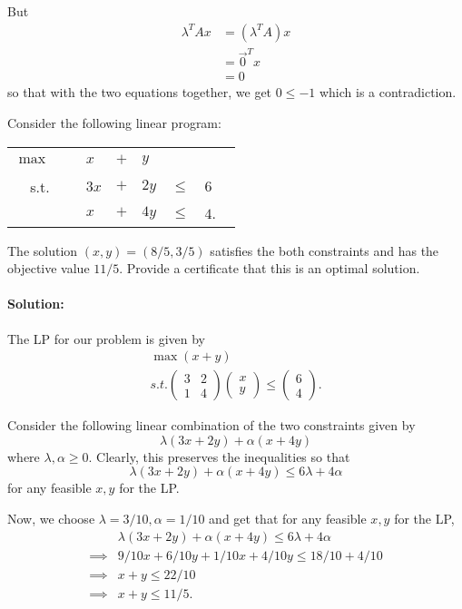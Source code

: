 \documentclass[11pt]{article}
\begin{document}
But 
\begin{align*}
\lambda^TAx & = (\lambda^TA)x \\
& = \vec{0}^Tx \\
& = 0
\end{align*}
so that with the two equations together, we get $0 \leq -1$ which is a contradiction. 

 
 
 
\problem Consider the following linear program:
\begin{center}
\begin{tabular}{rllllll}
$\max$ & \ & $x$ & $+$ & $y$ & \ & \\ 
s.t. & \ & $3x$ & $+$ & $2y$ & $\leq$ & $6$ \\ 
\ & \ & $x$ & $+$ & $4y$ & $\leq$ & $4$. \
\end{tabular} 
\end{center} 
The solution $(x, y)=(8/5 , 3/5)$ satisfies the both constraints and has the objective value $11/5$. Provide a certificate that this is an optimal solution.


\paragraph{Solution:}
The LP for our problem is given by 
\begin{align*}
\max (x + y) \\
s.t. \begin{pmatrix}  3 & 2 \\ 1 & 4 \end{pmatrix} \begin{pmatrix} x \\ y \end{pmatrix} \leq \begin{pmatrix} 6 \\ 4 \end{pmatrix}.
\end{align*}

Consider the following linear combination of the two constraints given by $$ \lambda (3x + 2y) + \alpha(x + 4y)$$
where $\lambda, \alpha \geq 0$. Clearly, this preserves the inequalities so that $$\lambda (3x + 2y) + \alpha(x + 4y) \leq 6 \lambda + 4 \alpha$$
for any feasible $x, y$ for the LP. 

Now, we choose $\lambda = 3/10, \alpha = 1/10$ and get that for any feasible $x, y$ for the LP, 
\begin{align*}
&\lambda (3x + 2y) + \alpha(x + 4y) \leq 6 \lambda + 4 \alpha \\
\implies & 9/10 x + 6/10 y + 1/10 x + 4/10 y \leq 18/10 + 4/10 \\
\implies & x + y \leq 22/10 \\
\implies & x + y \leq 11/5.
\end{align*}
\end{document}
